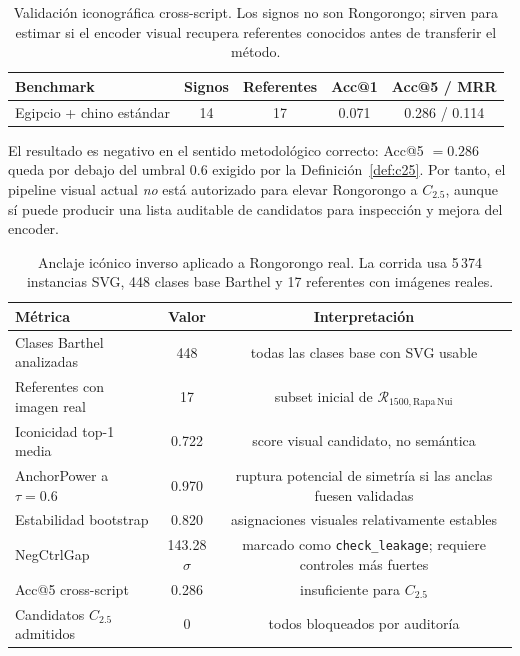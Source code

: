 \documentclass[11pt,a4paper]{article}
\newcommand{\1}{\mathbf{1}}
\numberwithin{equation}{section}
\begin{document}
\begin{table}[h]
\centering
\caption{Validación iconográfica cross-script. Los signos no son Rongorongo; sirven para estimar si el encoder visual recupera referentes conocidos antes de transferir el método.}
\label{tab:cross_script_iconic}
\begin{tabular}{lcccc}
\toprule
Benchmark & Signos & Referentes & Acc@1 & Acc@5 / MRR \\
\midrule
Egipcio + chino estándar & 14 & 17 & 0.071 & 0.286 / 0.114 \\
\bottomrule
\end{tabular}
\end{table}

El resultado es negativo en el sentido metodológico correcto: Acc@5 $=0.286$ queda por debajo del umbral $0.6$ exigido por la Definición~\ref{def:c25}. Por tanto, el pipeline visual actual \emph{no} está autorizado para elevar Rongorongo a $C_{2.5}$, aunque sí puede producir una lista auditable de candidatos para inspección y mejora del encoder.

\begin{table}[h]
\centering
\caption{Anclaje icónico inverso aplicado a Rongorongo real. La corrida usa 5\,374 instancias SVG, 448 clases base Barthel y 17 referentes con imágenes reales.}
\label{tab:rr_iconic_real}
\begin{tabular}{lcc}
\toprule
Métrica & Valor & Interpretación \\
\midrule
Clases Barthel analizadas & 448 & todas las clases base con SVG usable \\
Referentes con imagen real & 17 & subset inicial de $\mathcal{R}_{1500,\mathrm{Rapa\,Nui}}$ \\
Iconicidad top-1 media & 0.722 & score visual candidato, no semántica \\
AnchorPower a $\tau=0.6$ & 0.970 & ruptura potencial de simetría si las anclas fuesen validadas \\
Estabilidad bootstrap & 0.820 & asignaciones visuales relativamente estables \\
NegCtrlGap & 143.28$\sigma$ & marcado como \texttt{check\_leakage}; requiere controles más fuertes \\
Acc@5 cross-script & 0.286 & insuficiente para $C_{2.5}$ \\
Candidatos $C_{2.5}$ admitidos & 0 & todos bloqueados por auditoría \\
\bottomrule
\end{tabular}
\end{table}
\end{document}
